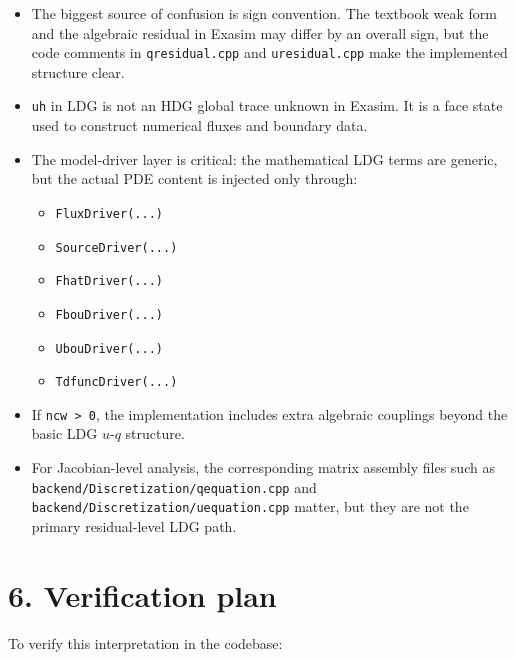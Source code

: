 \documentclass[11pt]{article}
\begin{document}
\begin{itemize}[leftmargin=*]
\item The biggest source of confusion is sign convention. The textbook weak
form and the algebraic residual in Exasim may differ by an overall sign, but
the code comments in \texttt{qresidual.cpp} and \texttt{uresidual.cpp} make the
implemented structure clear.
\item \texttt{uh} in LDG is not an HDG global trace unknown in Exasim. It is a
face state used to construct numerical fluxes and boundary data.
\item The model-driver layer is critical: the mathematical LDG terms are
generic, but the actual PDE content is injected only through:
\begin{itemize}[leftmargin=*]
\item \texttt{FluxDriver(...)}
\item \texttt{SourceDriver(...)}
\item \texttt{FhatDriver(...)}
\item \texttt{FbouDriver(...)}
\item \texttt{UbouDriver(...)}
\item \texttt{TdfuncDriver(...)}
\end{itemize}
\item If \texttt{ncw > 0}, the implementation includes extra algebraic couplings
beyond the basic LDG $u$-$q$ structure.
\item For Jacobian-level analysis, the corresponding matrix assembly files such
as \texttt{backend/Discretization/qequation.cpp} and
\texttt{backend/Discretization/uequation.cpp} matter, but they are not the
primary residual-level LDG path.
\end{itemize}

\section*{6. Verification plan}

To verify this interpretation in the codebase:
\end{document}

